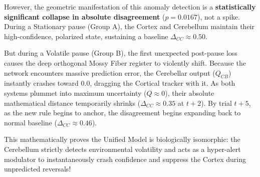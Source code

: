 \documentclass[11pt,a4paper]{article}
\begin{document}
However, the geometric manifestation of this anomaly detection is a \textbf{statistically significant collapse in absolute disagreement} ($p = 0.0167$), not a spike. 
During a Stationary pause (Group A), the Cortex and Cerebellum maintain their high-confidence, polarized state, sustaining a baseline $\Delta_{CC} \approx 0.50$. 

But during a Volatile pause (Group B), the first unexpected post-pause loss causes the deep orthogonal Mossy Fiber register to violently shift. Because the network encounters massive prediction error, the Cerebellar output ($Q_{CB}$) instantly crashes toward $0.0$, dragging the Cortical tracker with it. As both systems plummet into maximum uncertainty ($Q \approx 0$), their absolute mathematical distance temporarily shrinks ($\Delta_{CC} \approx 0.35$ at $t+2$). By trial $t+5$, as the new rule begins to anchor, the disagreement begins expanding back to normal baseline ($\Delta_{CC} \approx 0.46$).

This mathematically proves the Unified Model is biologically isomorphic: the Cerebellum strictly detects environmental volatility and acts as a hyper-alert modulator to instantaneously crash confidence and suppress the Cortex during unpredicted reversals!
\end{document}
